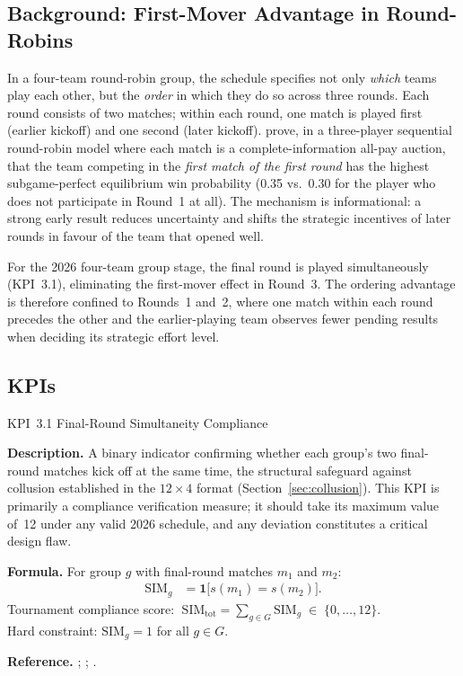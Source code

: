 \documentclass[12pt, letterpaper]{article}
\newcommand{\kpilabel}[1]{\noindent\textbf{#1}\enspace}
\begin{document}
\subsection{Background: First-Mover Advantage in Round-Robins}
\label{sec:firstmover}

In a four-team round-robin group, the schedule specifies not only
\emph{which} teams play each other, but the \emph{order} in which they
do so across three rounds.  Each round consists of two matches; within
each round, one match is played first (earlier kickoff) and one second
(later kickoff).  \citet{KrumerEtAl2017} prove, in a three-player
sequential round-robin model where each match is a complete-information
all-pay auction, that the team competing in the \emph{first match of
the first round} has the highest subgame-perfect equilibrium win
probability (0.35 vs.\ 0.30 for the player who does not participate in
Round~1 at all).  The mechanism is informational: a strong early result
reduces uncertainty and shifts the strategic incentives of later rounds
in favour of the team that opened well.

For the 2026 four-team group stage, the final round is played
simultaneously (KPI~3.1), eliminating the first-mover effect in
Round~3.  The ordering advantage is therefore confined to Rounds~1
and~2, where one match within each round precedes the other and the
earlier-playing team observes fewer pending results when deciding its
strategic effort level.

\subsection{KPIs}

\begin{kpibox}{KPI~3.1 \textendash{} Final-Round Simultaneity Compliance}

\kpilabel{Description.}
A binary indicator confirming whether each group's two final-round
matches kick off at the same time, the structural safeguard against
collusion established in the $12 \times 4$ format
(Section~\ref{sec:collusion}).  This KPI is primarily a compliance
verification measure; it should take its maximum value of~12 under any
valid 2026 schedule, and any deviation constitutes a critical design
flaw.

\medskip
\kpilabel{Formula.}
For group $g$ with final-round matches $m_1$ and $m_2$:
\begin{align*}
  \mathrm{SIM}_g &=
    \mathbf{1}\!\bigl[s(m_1) = s(m_2)\bigr].
\end{align*}
Tournament compliance score:
$\;\mathrm{SIM}_{\mathrm{tot}} =
\displaystyle\sum_{g \in G}\mathrm{SIM}_g \;\in\;\{0,\ldots,12\}$.
\\[4pt]
Hard constraint: $\mathrm{SIM}_g = 1$ for all $g \in G$.

\medskip
\kpilabel{Reference.}
\citet{Guyon2020}; \citet{GuajardoKrumer2024}; \citet{FIFA2023Format}.
\end{kpibox}
\end{document}
